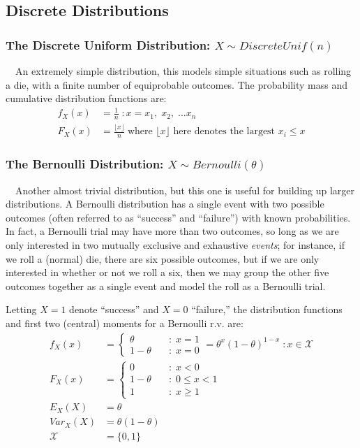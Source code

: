 \documentclass[12pt,a4paper]{article}
\begin{document}
\subsection{Discrete Distributions}

\subsubsection{The Discrete Uniform Distribution: $X \sim DiscreteUnif(n)$}

$\quad$An extremely simple distribution, this models simple situations such as rolling a die, with a finite number of equiprobable outcomes. The probability mass and cumulative distribution functions are:
\begin{align*}
f_X(x) &= \frac{1}{n} \; : x = x_1, \; x_2, \; ... x_n\\
F_X(x) &= \frac{\lfloor x \rfloor}{n} \; \mbox{where $\lfloor x \rfloor$ here denotes the largest $x_i \leq x$}
\end{align*}

\subsubsection{The Bernoulli Distribution: $X \sim Bernoulli(\theta)$}

$\quad$Another almost trivial distribution, but this one is useful for building up larger distributions. A Bernoulli distribution has a single event with two possible outcomes (often referred to as ``success'' and ``failure'') with known probabilities. In fact, a Bernoulli trial may have more than two outcomes, so long as we are only interested in two mutually exclusive and exhaustive \emph{events}; for instance, if we roll a (normal) die, there are six possible outcomes, but if we are only interested in whether or not we roll a six, then we may group the other five outcomes together as a single event and model the roll as a Bernoulli trial.

Letting $X=1$ denote ``success'' and $X=0$ ``failure,'' the distribution functions and first two (central) moments for a Bernoulli r.v. are:
\begin{align*}
f_X(x) &= \left\{ \begin{array}{cl} \theta \quad & : \; x = 1\\ 1-\theta \quad & : \; x = 0 \end{array} \right. = \theta^x(1-\theta)^{1-x} \; : x \in \mathcal{X}\\
F_X(x) &= \left\{ \begin{array}{cl} 0 \quad & : \; x < 0\\ 1-\theta \quad & : \; 0 \leq x < 1\\ 1 \quad & : \; x \geq 1 \end{array} \right.\\
E_{X}(X) &= \theta\\
Var_{X}(X) &= \theta(1-\theta)\\
\mathcal{X} &= \{0,1\}
\end{align*}
\end{document}

